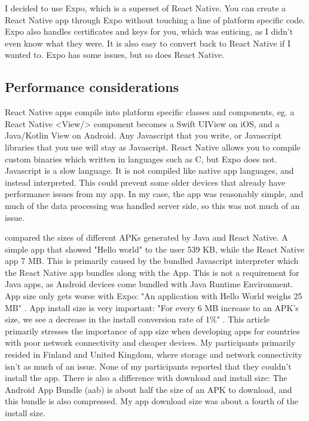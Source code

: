 \documentclass{l4proj}
\begin{document}
I decided to use Expo, which is a superset of React Native. You can create a React Native app through Expo without touching a line of platform specific code. Expo also handles certificates and keys for you, which was enticing, as I didn't even know what they were. It is also easy to convert back to React Native if I wanted to. Expo has some issues, but so does React Native. 


\subsection{Performance considerations}
React Native apps compile into platform specific classes and components, eg. a React Native <View/> component becomes a Swift UIView on iOS, and a Java/Kotlin View on Android. Any Javascript that you write, or Javascript libraries that you use will stay as Javascript. React Native allows you to compile custom binaries which written in languages such as C, but Expo does not. Javascript is a slow language. It is not compiled like native app languages, and instead interpreted. This could prevent some older devices that already have performance issues from my app. In my case, the app was reasonably simple, and much of the data processing was handled server side, so this was not much of an issue. 

\citet{app_size} compared the sizes of different APKs generated by Java and React Native. A simple app that showed "Hello world" to the user 539 KB, while the React Native app 7 MB. This is primarily caused by the bundled Javascript interpreter which the React Native app bundles along with the App. This is not a requirement for Java apps, as Android devices come bundled with Java Runtime Environment. App size only gets worse with Expo: "An application with Hello World weighs 25 MB" \citep{expo}. App install size is very important: "For every 6 MB increase to an APK’s size, we see a decrease in the install conversion rate of 1\%" \citep{app_conversions}. This article primarily stresses the importance of app size when developing apps for countries with poor network connectivity and cheaper devices. My participants primarily resided in Finland and United Kingdom, where storage and network connectivity isn't as much of an issue. None of my participants reported that they couldn't install the app. There is also a difference with download and install size: The Android App Bundle (aab) is about half the size of an APK to download, and this bundle is also compressed. My app download size was about a fourth of the install size.
\end{document}
